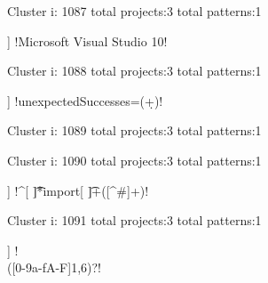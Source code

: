 Cluster i: 1087
total projects:3
total patterns:1
\begin{multicols}{1}
\begin{description}[noitemsep,topsep=0pt]
\item [[3] ] \cverb!Microsoft Visual Studio 10!
\end{description}
\end{multicols}







Cluster i: 1088
total projects:3
total patterns:1
\begin{multicols}{1}
\begin{description}[noitemsep,topsep=0pt]
\item [[3] ] \cverb!unexpectedSuccesses=(\d+)!
\end{description}
\end{multicols}







Cluster i: 1089
total projects:3
total patterns:1
\begin{multicols}{1}
\end{multicols}







Cluster i: 1090
total projects:3
total patterns:1
\begin{multicols}{1}
\begin{description}[noitemsep,topsep=0pt]
\item [[3] ] \cverb!^[ \t]*import[ \t]+([^#]+)!
\end{description}
\end{multicols}







Cluster i: 1091
total projects:3
total patterns:1
\begin{multicols}{1}
\begin{description}[noitemsep,topsep=0pt]
\item [[3] ] \cverb!\\([0-9a-fA-F]{1,6})\s?!
\end{description}
\end{multicols}







